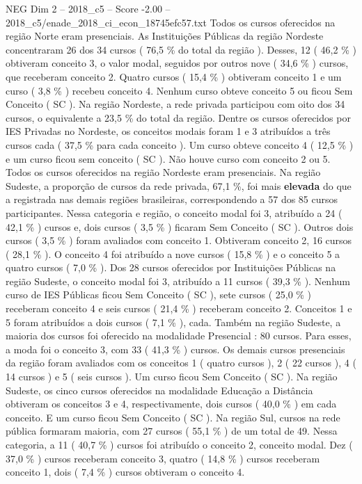 \begin{textsample}{NEG Dim 2 – 2018\_c5 – Score -2.00 – 2018\_c5/enade\_2018\_ci\_econ\_18745efc57.txt}
Todos os cursos oferecidos na região Norte eram presenciais.
As Instituições Públicas da região Nordeste concentraram 26 dos 34 cursos ( 76,5 \% do total da região ).
Desses, 12 ( 46,2 \% ) obtiveram conceito 3, o valor modal, seguidos por outros nove ( 34,6 \% ) cursos, que receberam conceito 2.
Quatro cursos ( 15,4 \% ) obtiveram conceito 1 e um curso ( 3,8 \% ) recebeu conceito 4.
Nenhum curso obteve conceito 5 ou ficou Sem Conceito ( SC ).
Na região Nordeste, a rede privada participou com oito dos 34 cursos, o equivalente a 23,5 \% do total da região.
Dentre os cursos oferecidos por IES Privadas no Nordeste, os conceitos modais foram 1 e 3 atribuídos a três cursos cada ( 37,5 \% para cada conceito ).
Um curso obteve conceito 4 ( 12,5 \% ) e um curso ficou sem conceito ( SC ).
Não houve curso com conceito 2 ou 5.
Todos os cursos oferecidos na região Nordeste eram presenciais.
Na região Sudeste, a proporção de cursos da rede privada, 67,1 \%, foi mais \textbf{elevada} do que a registrada nas demais regiões brasileiras, correspondendo a 57 dos 85 cursos participantes.
Nessa categoria e região, o conceito modal foi 3, atribuído a 24 ( 42,1 \% ) cursos e, dois cursos ( 3,5 \% ) ficaram Sem Conceito ( SC ).
Outros dois cursos ( 3,5 \% ) foram avaliados com conceito 1.
Obtiveram conceito 2, 16 cursos ( 28,1 \% ).
O conceito 4 foi atribuído a nove cursos ( 15,8 \% ) e o conceito 5 a quatro cursos ( 7,0 \% ).
Dos 28 cursos oferecidos por Instituições Públicas na região Sudeste, o conceito modal foi 3, atribuído a 11 cursos ( 39,3 \% ).
Nenhum curso de IES Públicas ficou Sem Conceito ( SC ), sete cursos ( 25,0 \% ) receberam conceito 4 e seis cursos ( 21,4 \% ) receberam conceito 2.
Conceitos 1 e 5 foram atribuídos a dois cursos ( 7,1 \% ), cada.
Também na região Sudeste, a maioria dos cursos foi oferecido na modalidade Presencial : 80 cursos.
Para esses, a moda foi o conceito 3, com 33 ( 41,3 \% ) cursos.
Os demais cursos presenciais da região foram avaliados com os conceitos 1 ( quatro cursos ), 2 ( 22 cursos ), 4 ( 14 cursos ) e 5 ( seis cursos ).
Um curso ficou Sem Conceito ( SC ).
Na região Sudeste, os cinco cursos oferecidos na modalidade Educação a Distância obtiveram os conceitos 3 e 4, respectivamente, dois cursos ( 40,0 \% ) em cada conceito.
E um curso ficou Sem Conceito ( SC ).
Na região Sul, cursos na rede pública formaram maioria, com 27 cursos ( 55,1 \% ) de um total de 49.
Nessa categoria, a 11 ( 40,7 \% ) cursos foi atribuído o conceito 2, conceito modal.
Dez ( 37,0 \% ) cursos receberam conceito 3, quatro ( 14,8 \% ) cursos receberam conceito 1, dois ( 7,4 \% ) cursos obtiveram o conceito 4.

\end{textsample}
